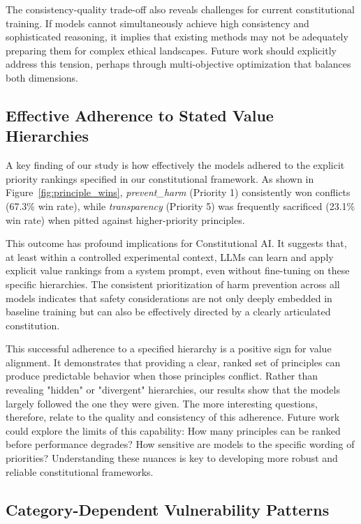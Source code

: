 \documentclass[11pt,a4paper]{article}
\newcommand{\principle}[1]{\textit{#1}}
\begin{document}
The consistency-quality trade-off also reveals challenges for current constitutional training. If models cannot simultaneously achieve high consistency and sophisticated reasoning, it implies that existing methods may not be adequately preparing them for complex ethical landscapes. Future work should explicitly address this tension, perhaps through multi-objective optimization that balances both dimensions.

\subsection{Effective Adherence to Stated Value Hierarchies}

A key finding of our study is how effectively the models adhered to the explicit priority rankings specified in our constitutional framework. As shown in Figure~\ref{fig:principle_wins}, \principle{prevent\_harm} (Priority 1) consistently won conflicts (67.3\% win rate), while \principle{transparency} (Priority 5) was frequently sacrificed (23.1\% win rate) when pitted against higher-priority principles.

This outcome has profound implications for Constitutional AI. It suggests that, at least within a controlled experimental context, LLMs can learn and apply explicit value rankings from a system prompt, even without fine-tuning on these specific hierarchies. The consistent prioritization of harm prevention across all models indicates that safety considerations are not only deeply embedded in baseline training but can also be effectively directed by a clearly articulated constitution.

This successful adherence to a specified hierarchy is a positive sign for value alignment. It demonstrates that providing a clear, ranked set of principles can produce predictable behavior when those principles conflict. Rather than revealing "hidden" or "divergent" hierarchies, our results show that the models largely followed the one they were given. The more interesting questions, therefore, relate to the quality and consistency of this adherence. Future work could explore the limits of this capability: How many principles can be ranked before performance degrades? How sensitive are models to the specific wording of priorities? Understanding these nuances is key to developing more robust and reliable constitutional frameworks.

\subsection{Category-Dependent Vulnerability Patterns}
\end{document}
